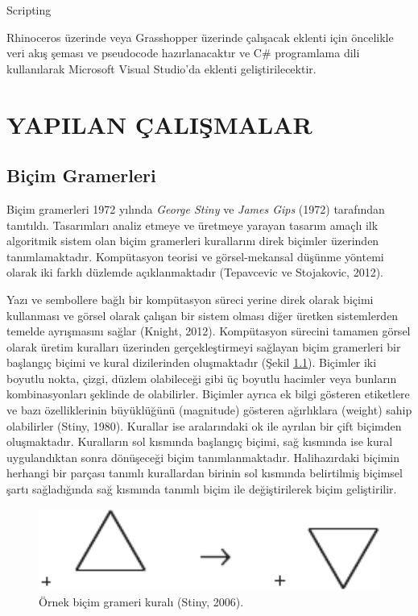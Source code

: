 \documentclass[12pt,turkish,a4paperpaper,]{report}
\begin{document}
Scripting

Rhinoceros üzerinde veya Grasshopper üzerinde çalışacak eklenti için
öncelikle veri akış şeması ve pseudocode hazırlanacaktır ve C\#
programlama dili kullanılarak Microsoft Visual Studio'da eklenti
geliştirilecektir.

\hypertarget{yapilan-uxe7aliux15fmalar}{%
\chapter{YAPILAN ÇALIŞMALAR}\label{yapilan-uxe7aliux15fmalar}}

\thispagestyle{empty}

\hypertarget{biuxe7im-gramerleri}{%
\section{Biçim Gramerleri}\label{biuxe7im-gramerleri}}

Biçim gramerleri 1972 yılında \emph{George Stiny} ve \emph{James Gips}
(1972) tarafından tanıtıldı. Tasarımları analiz etmeye ve üretmeye
yarayan tasarım amaçlı ilk algoritmik sistem olan biçim gramerleri
kurallarını direk biçimler üzerinden tanımlamaktadır. Kompütasyon
teorisi ve görsel-mekansal düşünme yöntemi olarak iki farklı düzlemde
açıklanmaktadır (Tepavcevic ve Stojakovic, 2012).

Yazı ve sembollere bağlı bir kompütasyon süreci yerine direk olarak
biçimi kullanması ve görsel olarak çalışan bir sistem olması diğer
üretken sistemlerden temelde ayrışmasını sağlar (Knight, 2012).
Kompütasyon sürecini tamamen görsel olarak üretim kuralları üzerinden
gerçekleştirmeyi sağlayan biçim gramerleri bir başlangıç biçimi ve kural
dizilerinden oluşmaktadır (Şekil \ref{shapegrammarrule}). Biçimler iki
boyutlu nokta, çizgi, düzlem olabileceği gibi üç boyutlu hacimler veya
bunların kombinasyonları şeklinde de olabilirler. Biçimler ayrıca ek
bilgi gösteren etiketlere ve bazı özelliklerinin büyüklüğünü (magnitude)
gösteren ağırlıklara (weight) sahip olabilirler (Stiny, 1980). Kurallar
ise aralarındaki ok ile ayrılan bir çift biçimden oluşmaktadır.
Kuralların sol kısmında başlangıç biçimi, sağ kısmında ise kural
uygulandıktan sonra dönüşeceği biçim tanımlanmaktadır. Halihazırdaki
biçimin herhangi bir parçası tanımlı kurallardan birinin sol kısmında
belirtilmiş biçimsel şartı sağladığında sağ kısmında tanımlı biçim ile
değiştirilerek biçim geliştirilir.

\begin{figure}
\centering
\includegraphics[width=1\textwidth,height=\textheight]{source/figures/shape_grammar_rule.pdf}
\caption{Örnek biçim grameri kuralı (Stiny, 2006).
\label{shapegrammarrule}}
\end{figure}
\end{document}
